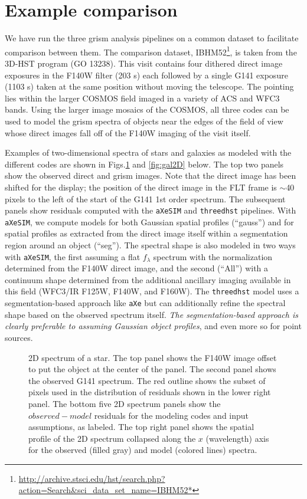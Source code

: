 \documentclass[preprint]{aastex}
\begin{document}
\section{Example comparison}

We have run the three grism analysis pipelines on a common dataset to facilitate comparison between them.  The comparison dataset, IBHM52\footnote{\url{http://archive.stsci.edu/hst/search.php?action=Search&sci_data_set_name=IBHM52*}}, is taken from the 3D-HST program (GO 13238).  This visit contains four dithered direct image exposures in the F140W filter (203 s) each followed by a single G141 exposure (1103 s) taken at the same position without moving the telescope.  The pointing lies within the larger COSMOS field imaged in a variety of ACS and WFC3 bands.  Using the larger image mosaics of the COSMOS, all three codes can be used to model the grism spectra of objects near the edges of the field of view whose direct images fall off of the F140W imaging of the visit itself.
    
    Examples of two-dimensional spectra of stars and galaxies as modeled with the different codes are shown in Figs.\ref{fig:star2D} and \ref{fig:gal2D} below.  The top two panels show the observed direct and grism images.  Note that the direct image has been shifted for the display; the position of the direct image in the FLT frame is $\sim$40 pixels to the left of the start of the G141 1st order spectrum.  The subsequent panels show residuals computed with the \texttt{aXeSIM} and \texttt{threedhst} pipelines.  With \texttt{aXeSIM}, we compute models for both Gaussian spatial profiles (``gauss'') and for spatial profiles as extracted from the direct image itself within a segmentation region around an object (``seg'').  The spectral shape is also modeled in two ways with \texttt{aXeSIM}, the first assuming a flat $f_\lambda$ spectrum with the normalization determined from the F140W direct image, and the second (``All'') with a continuum shape determined from the additional ancillary imaging available in this field (WFC3/IR F125W, F140W, and F160W).  The \texttt{threedhst} model uses a segmentation-based approach like \texttt{aXe} but can additionally refine the spectral shape based on the observed spectrum itself.  \textit{The segmentation-based approach is clearly preferable to assuming Gaussian object profiles}, and even more so for point sources.  
    

\begin{figure}
    \caption{2D spectrum of a star.  The top panel shows the F140W image offset to put the object at the center of the panel.  The second panel shows the observed G141 spectrum.  The red outline shows the subset of pixels used in the distribution of residuals shown in the lower right panel.  The bottom five 2D spectrum panels show the $observed-model$ residuals for the modeling codes and input assumptions, as labeled.  The top right panel shows the spatial profile of the 2D spectrum collapsed along the $x$ (wavelength) axis for the observed (filled gray) and model (colored lines) spectra.}
    \label{fig:star2D}
\end{figure}
\end{document}
